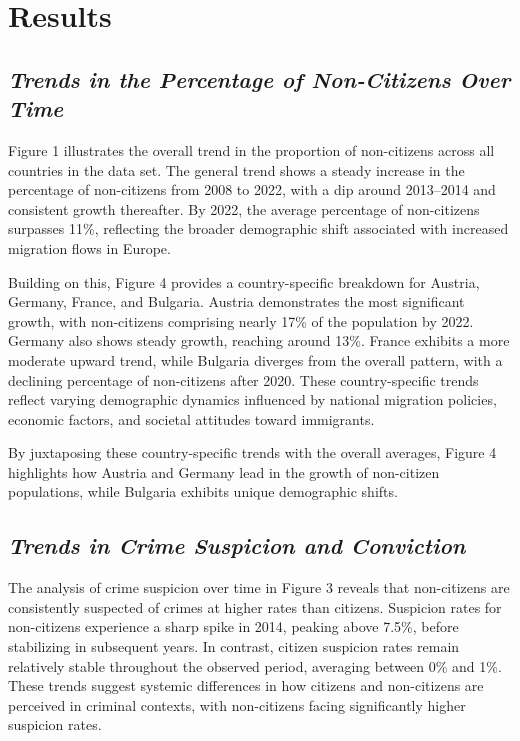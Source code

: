 \documentclass[
]{article}
\begin{document}
\section{Results}\label{results}

\subsection{\texorpdfstring{\emph{Trends in the Percentage of
Non-Citizens Over
Time}}{Trends in the Percentage of Non-Citizens Over Time}}\label{trends-in-the-percentage-of-non-citizens-over-time}

Figure 1 illustrates the overall trend in the proportion of non-citizens
across all countries in the data set. The general trend shows a steady
increase in the percentage of non-citizens from 2008 to 2022, with a dip
around 2013--2014 and consistent growth thereafter. By 2022, the average
percentage of non-citizens surpasses 11\%, reflecting the broader
demographic shift associated with increased migration flows in Europe.

Building on this, Figure 4 provides a country-specific breakdown for
Austria, Germany, France, and Bulgaria. Austria demonstrates the most
significant growth, with non-citizens comprising nearly 17\% of the
population by 2022. Germany also shows steady growth, reaching around
13\%. France exhibits a more moderate upward trend, while Bulgaria
diverges from the overall pattern, with a declining percentage of
non-citizens after 2020. These country-specific trends reflect varying
demographic dynamics influenced by national migration policies, economic
factors, and societal attitudes toward immigrants.

By juxtaposing these country-specific trends with the overall averages,
Figure 4 highlights how Austria and Germany lead in the growth of
non-citizen populations, while Bulgaria exhibits unique demographic
shifts.

\subsection{\texorpdfstring{\emph{Trends in Crime Suspicion and
Conviction}}{Trends in Crime Suspicion and Conviction}}\label{trends-in-crime-suspicion-and-conviction}

The analysis of crime suspicion over time in Figure 3 reveals that
non-citizens are consistently suspected of crimes at higher rates than
citizens. Suspicion rates for non-citizens experience a sharp spike in
2014, peaking above 7.5\%, before stabilizing in subsequent years. In
contrast, citizen suspicion rates remain relatively stable throughout
the observed period, averaging between 0\% and 1\%. These trends suggest
systemic differences in how citizens and non-citizens are perceived in
criminal contexts, with non-citizens facing significantly higher
suspicion rates.
\end{document}
